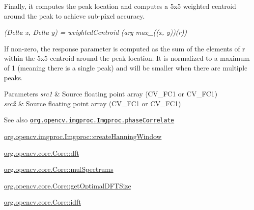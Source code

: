 \begin{DoxyItemize}
\item Finally, it computes the peak location and computes a 5x5 weighted centroid around the peak to achieve sub-\/pixel accuracy. 
\end{DoxyItemize}

{\itshape (Delta x, Delta y) = weighted\+Centroid (arg max\+\_\+((x, y))(r))}


\begin{DoxyItemize}
\item If non-\/zero, the response parameter is computed as the sum of the elements of r within the 5x5 centroid around the peak location. It is normalized to a maximum of 1 (meaning there is a single peak) and will be smaller when there are multiple peaks. 
\end{DoxyItemize}


\begin{DoxyParams}{Parameters}
{\em src1} & Source floating point array (C\+V\+\_\+F\+C1 or C\+V\+\_\+F\+C1) \\
\hline
{\em src2} & Source floating point array (C\+V\+\_\+F\+C1 or C\+V\+\_\+F\+C1)\\
\hline
\end{DoxyParams}
\begin{DoxySeeAlso}{See also}
\href{http://docs.opencv.org/modules/imgproc/doc/motion_analysis_and_object_tracking.html#phasecorrelate}{\tt org.\+opencv.\+imgproc.\+Imgproc.\+phase\+Correlate} 

\mbox{\hyperlink{classorg_1_1opencv_1_1imgproc_1_1_imgproc_a8953a925c05f058b4b992831fea01eee}{org.\+opencv.\+imgproc.\+Imgproc\+::create\+Hanning\+Window}} 

\mbox{\hyperlink{classorg_1_1opencv_1_1core_1_1_core_a43313221157a3008972a04727a65a58d}{org.\+opencv.\+core.\+Core\+::dft}} 

\mbox{\hyperlink{classorg_1_1opencv_1_1core_1_1_core_a249146033929c968ef948e290c2a438c}{org.\+opencv.\+core.\+Core\+::mul\+Spectrums}} 

\mbox{\hyperlink{classorg_1_1opencv_1_1core_1_1_core_a9818ffe89dca479da8352d5bf6ebd6b3}{org.\+opencv.\+core.\+Core\+::get\+Optimal\+D\+F\+T\+Size}} 

\mbox{\hyperlink{classorg_1_1opencv_1_1core_1_1_core_a4fc0b0f22fef014f5e602e8d5b367a44}{org.\+opencv.\+core.\+Core\+::idft}} 
\end{DoxySeeAlso}
\mbox{\label{classorg_1_1opencv_1_1imgproc_1_1_imgproc_a8f62667aea7153feaf585aff643a5826}} 
